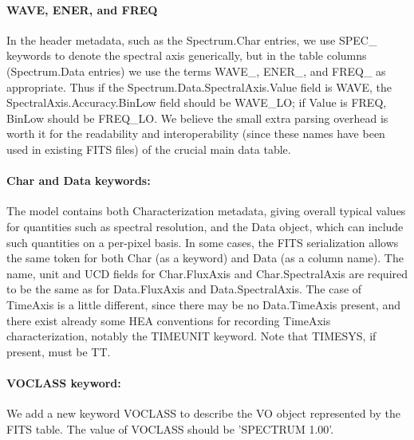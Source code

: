 \paragraph {\bf WAVE, ENER, and FREQ}

In the header metadata, such as the Spectrum.Char entries,
we use SPEC\_ keywords to denote the spectral axis generically, but
in the table columns (Spectrum.Data entries) we use the
terms WAVE\_, ENER\_, and FREQ\_ as appropriate. 
Thus if the Spectrum.Data.SpectralAxis.Value field is WAVE,
the SpectralAxis.Accuracy.BinLow field should be WAVE\_LO;
if Value is FREQ, BinLow should be FREQ\_LO. 
We believe the small extra parsing overhead is worth it
for the readability and interoperability (since these names have
been used in existing FITS files) of the crucial main data table.


\paragraph {\bf Char and Data keywords:}
The model contains both Characterization metadata, giving
overall typical values for quantities such as spectral resolution,
and the Data object, which can include such quantities on
a per-pixel basis. In some cases, the FITS serialization allows
the same token for both Char (as a keyword) and Data (as a column name).
The name, unit and UCD fields for Char.FluxAxis and Char.SpectralAxis
are required to be the same as for Data.FluxAxis and Data.SpectralAxis.
The case of TimeAxis is a little different, since there may be no
Data.TimeAxis present, and there exist already some HEA conventions for
recording TimeAxis characterization, notably the TIMEUNIT keyword.
Note that TIMESYS, if present, must be TT.

\paragraph {\bf VOCLASS keyword:}
We add a new keyword VOCLASS to describe the VO object represented by the
FITS table. The value of VOCLASS should be 'SPECTRUM 1.00'.



